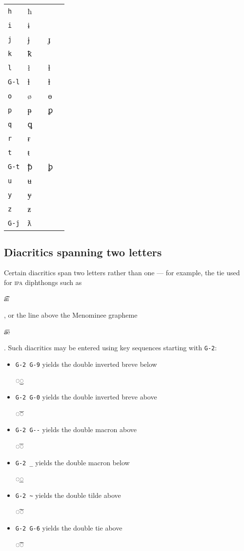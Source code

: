\documentclass[oneside]{memoir}
\newcommand{\cmark}{\ding{51}}
\newcommand{\xmark}{\ding{55}}
\newcommand{\key}{\verb}
\newcommand{\out}[1]{\colorbox{gray!20}{\strut{}#1}}
\begin{document}
{\begin{table}[!b]
\begin{minipage}{0.55\paperwidth}
\begin{tabular}{lllll}
\key|h|   & ħ & \cmark &   & \\
\key|i|   & ɨ & \cmark &   & \\
\key|j|   & ɉ & \cmark & ɟ & \xmark \\
\key|k|   & ꝁ & \cmark &   & \\
\key|l|   & ł & \cmark & ƚ & \cmark \\
\key|G-l| & ɫ & \cmark & ⱡ & \cmark \\
\key|o|   & ø & \cmark & ɵ & \cmark \\
\key|p|   & ᵽ & \cmark & ꝑ & \cmark \\
\key|q|   & ꝗ & \cmark &   & \\
\key|r|   & ɍ & \cmark &   & \\
\key|t|   & ŧ & \cmark &   & \\
\key|G-t| & ꝥ & \cmark & ꝧ & \cmark \\
\key|u|   & ʉ & \cmark &   & \\
\key|y|   & ɏ & \cmark &   & \\
\key|z|   & ƶ & \cmark &   & \\
\key|G-j| & ƛ & \xmark &   & \\
\bottomrule
\end{tabular}
\end{minipage}
\end{table}

\subsection{Diacritics spanning two letters}
\label{sec:diacritics_spanning_two_letters}

Certain diacritics span two letters rather than one --- for example, the tie used for \textsc{ipa} diphthongs such as \out{a͡i}, or the line above the Menominee grapheme \out{a͞e}.
Such diacritics may be entered using key sequences starting with \key|G-2|:

\begin{itemize}[noitemsep]
\item \key|G-2 G-9| yields the double inverted breve below \out{◌͜◌}
\item \key|G-2 G-0| yields the double inverted breve above \out{◌͝◌}
\item \key|G-2 G--| yields the double macron above \out{◌͞◌}
\item \key|G-2 _| yields the double macron below \out{◌͟◌}
\item \key|G-2 ~| yields the double tilde above \out{◌͠◌}
\item \key|G-2 G-6| yields the double tie above \out{◌͡◌}
\end{itemize}

}
\end{document}
